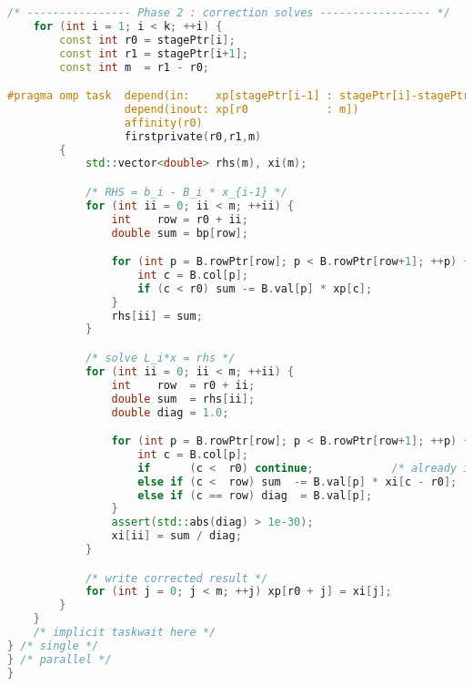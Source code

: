 \begin{lstlisting}[language=C++,caption={Full implementation of the
\texttt{blockBiDiagSolveTasks} kernel.}]
    /* ---------------- Phase 2 : correction solves ----------------- */
    for (int i = 1; i < k; ++i) {
        const int r0 = stagePtr[i];
        const int r1 = stagePtr[i+1];
        const int m  = r1 - r0;

#pragma omp task  depend(in:    xp[stagePtr[i-1] : stagePtr[i]-stagePtr[i-1]]) \
                  depend(inout: xp[r0            : m])                          \
                  affinity(r0)
                  firstprivate(r0,r1,m)
        {
            std::vector<double> rhs(m), xi(m);

            /* RHS = b_i - B_i * x_{i-1} */
            for (int ii = 0; ii < m; ++ii) {
                int    row = r0 + ii;
                double sum = bp[row];

                for (int p = B.rowPtr[row]; p < B.rowPtr[row+1]; ++p) {
                    int c = B.col[p];
                    if (c < r0) sum -= B.val[p] * xp[c];
                }
                rhs[ii] = sum;
            }

            /* solve L_i*x = rhs */
            for (int ii = 0; ii < m; ++ii) {
                int    row  = r0 + ii;
                double sum  = rhs[ii];
                double diag = 1.0;

                for (int p = B.rowPtr[row]; p < B.rowPtr[row+1]; ++p) {
                    int c = B.col[p];
                    if      (c <  r0) continue;            /* already in RHS   */
                    else if (c <  row) sum  -= B.val[p] * xi[c - r0];
                    else if (c == row) diag  = B.val[p];
                }
                assert(std::abs(diag) > 1e-30);
                xi[ii] = sum / diag;
            }

            /* write corrected result */
            for (int j = 0; j < m; ++j) xp[r0 + j] = xi[j];
        }
    }
    /* implicit taskwait here */
} /* single */
} /* parallel */
}
\end{lstlisting}
